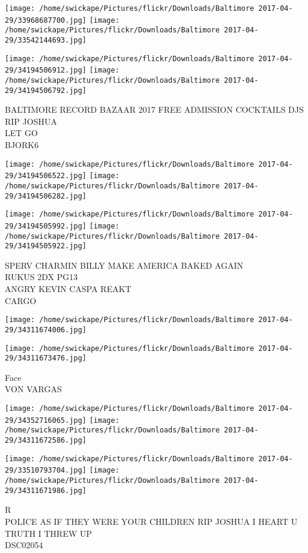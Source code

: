 \documentclass[10pt,letterpaper]{article}
\begin{document}
\texttt{[image: /home/swickape/Pictures/flickr/Downloads/Baltimore 2017-04-29/33968687700.jpg]}
\texttt{[image: /home/swickape/Pictures/flickr/Downloads/Baltimore 2017-04-29/33542144693.jpg]}

\texttt{[image: /home/swickape/Pictures/flickr/Downloads/Baltimore 2017-04-29/34194506912.jpg]}
\texttt{[image: /home/swickape/Pictures/flickr/Downloads/Baltimore 2017-04-29/34194506792.jpg]}

BALTIMORE RECORD BAZAAR 2017 FREE ADMISSION COCKTAILS DJS\\
RIP JOSHUA\\
LET GO\\
BJORK6
\pagebreak

\texttt{[image: /home/swickape/Pictures/flickr/Downloads/Baltimore 2017-04-29/34194506522.jpg]}
\texttt{[image: /home/swickape/Pictures/flickr/Downloads/Baltimore 2017-04-29/34194506282.jpg]}

\texttt{[image: /home/swickape/Pictures/flickr/Downloads/Baltimore 2017-04-29/34194505992.jpg]}
\texttt{[image: /home/swickape/Pictures/flickr/Downloads/Baltimore 2017-04-29/34194505922.jpg]}

SPERV CHARMIN BILLY MAKE AMERICA BAKED AGAIN\\
RUKUS 2DX PG13\\
ANGRY KEVIN CASPA REAKT\\
CARGO
\pagebreak

\texttt{[image: /home/swickape/Pictures/flickr/Downloads/Baltimore 2017-04-29/34311674006.jpg]}

\vspace{0.25in}
\texttt{[image: /home/swickape/Pictures/flickr/Downloads/Baltimore 2017-04-29/34311673476.jpg]}

Face\\
VON VARGAS
\pagebreak

\texttt{[image: /home/swickape/Pictures/flickr/Downloads/Baltimore 2017-04-29/34352716065.jpg]}
\texttt{[image: /home/swickape/Pictures/flickr/Downloads/Baltimore 2017-04-29/34311672586.jpg]}

\texttt{[image: /home/swickape/Pictures/flickr/Downloads/Baltimore 2017-04-29/33510793704.jpg]}
\texttt{[image: /home/swickape/Pictures/flickr/Downloads/Baltimore 2017-04-29/34311671986.jpg]}

R\\
POLICE AS IF THEY WERE YOUR CHILDREN RIP JOSHUA I HEART U\\
TRUTH I THREW UP\\
DSC02054
\pagebreak
\end{document}
